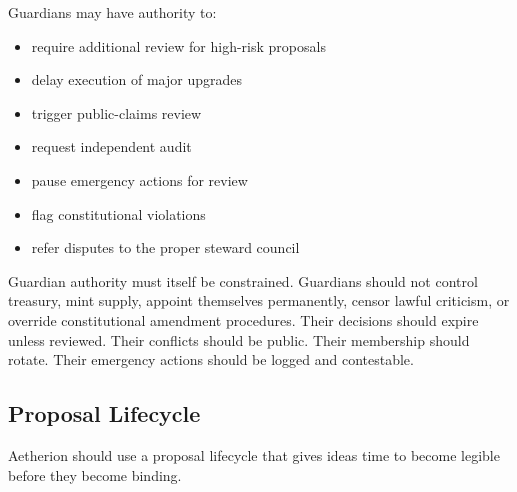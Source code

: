 \documentclass[12pt]{article}
\begin{document}
Guardians may have authority to:

\begin{itemize}
  \item require additional review for high-risk proposals
  \item delay execution of major upgrades
  \item trigger public-claims review
  \item request independent audit
  \item pause emergency actions for review
  \item flag constitutional violations
  \item refer disputes to the proper steward council
\end{itemize}

Guardian authority must itself be constrained. Guardians should not control treasury, mint supply, appoint themselves permanently, censor lawful criticism, or override constitutional amendment procedures. Their decisions should expire unless reviewed. Their conflicts should be public. Their membership should rotate. Their emergency actions should be logged and contestable.

\subsection{Proposal Lifecycle}

Aetherion should use a proposal lifecycle that gives ideas time to become legible before they become binding.
\end{document}
